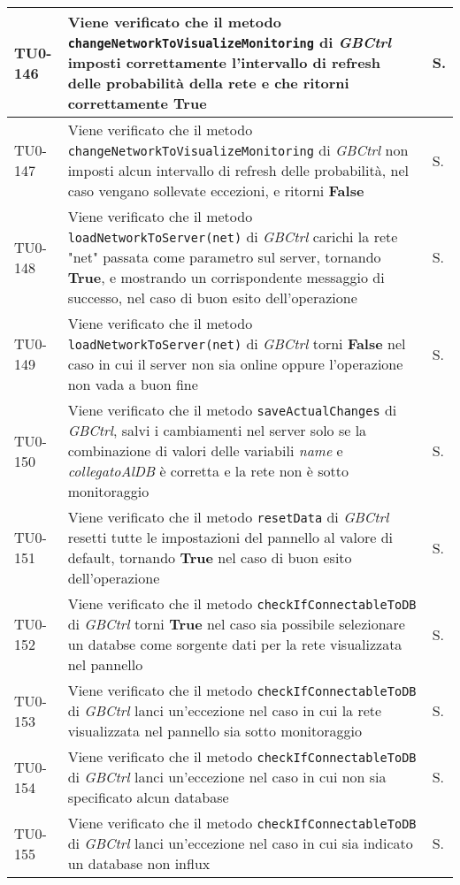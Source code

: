 \begin{longtable}{|C{.15\textwidth}|m{.66\textwidth}|C{.10\textwidth}|}
\hline
TU0-146 & Viene verificato che il metodo \texttt{changeNetworkToVisualizeMonitoring} di \textit{GBCtrl} imposti correttamente l'intervallo di refresh delle probabilità della rete e che ritorni correttamente \textbf{True} & S.\\
\hline
{}TU0-147 & Viene verificato che il metodo \texttt{changeNetworkToVisualizeMonitoring} di \textit{GBCtrl} non imposti alcun intervallo di refresh delle probabilità, nel caso vengano sollevate eccezioni, e ritorni \textbf{False} & S.\\
\hline
TU0-148 & Viene verificato che il metodo \texttt{loadNetworkToServer(net)} di \textit{GBCtrl} carichi la rete "net" passata come parametro sul server, tornando \textbf{True}, e mostrando un corrispondente messaggio di successo, nel caso di buon esito dell'operazione & S.\\
\hline
{}TU0-149 & Viene verificato che il metodo \texttt{loadNetworkToServer(net)} di \textit{GBCtrl} torni \textbf{False} nel caso in cui il server non sia online oppure l'operazione non vada a buon fine & S.\\
\hline
TU0-150 & Viene verificato che il metodo \texttt{saveActualChanges} di \textit{GBCtrl}, salvi i cambiamenti nel server solo se la combinazione di valori delle variabili \textit{name} e \textit{collegatoAlDB} è corretta e la rete non è sotto monitoraggio & S.\\
\hline
{}TU0-151 & Viene verificato che il metodo \texttt{resetData} di \textit{GBCtrl} resetti tutte le impostazioni del pannello al valore di default, tornando \textbf{True} nel caso di buon esito dell'operazione & S.\\
\hline
TU0-152 & Viene verificato che il metodo \texttt{checkIfConnectableToDB} di \textit{GBCtrl} torni \textbf{True} nel caso sia possibile selezionare un databse come sorgente dati per la rete visualizzata nel pannello & S.\\
\hline
{}TU0-153 & Viene verificato che il metodo \texttt{checkIfConnectableToDB} di \textit{GBCtrl} lanci un'eccezione nel caso in cui la rete visualizzata nel pannello sia sotto monitoraggio & S.\\
\hline
TU0-154 & Viene verificato che il metodo \texttt{checkIfConnectableToDB} di \textit{GBCtrl} lanci un'eccezione nel caso in cui non sia specificato alcun database & S.\\
\hline
{}TU0-155 & Viene verificato che il metodo \texttt{checkIfConnectableToDB} di \textit{GBCtrl} lanci un'eccezione nel caso in cui sia indicato un database non influx & S.\\

\end{longtable}
